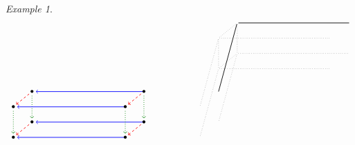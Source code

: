 \documentclass[12pt]{amsart}
\theoremstyle{definition}
\theoremstyle{remark}
\newtheorem{example}[thm]{Example}
\numberwithin{equation}{section}
\begin{document}
\begin{example}
\begin{equation}
\begin{array}{l}
\begin{tikzpicture}[yscale=0.7,xscale=0.85]
\begin{scope}[xshift=6cm]
\end{scope}

\begin{scope}[yshift=-4.5cm,xshift=-1cm]

\node[inner sep=1pt,circle] (00) at (0,0) {\tiny $\bullet$};
\node[inner sep=1pt,circle] (11) at (1,1) {\tiny $\bullet$};
\node[inner sep=1pt,circle] (02) at (0,2) {\tiny $\bullet$};
\node[inner sep=1pt,circle] (13) at (1,3) {\tiny $\bullet$};

\draw[<-,green!50!black,dotted,thick] (00) -- (02); 
\draw[<-,green!50!black,dotted,thick] (11) -- (13); 
\draw[<-,red,dashed,thick] (00) -- (11);
\draw[<-,red,dashed,thick] (02) -- (13);
    

\draw[<-,blue,thick] (00) -- (6,0);
\draw[<-,blue,thick] (13) -- (7,3);
\draw[<-,blue,thick] (11) -- (7,1);
\draw[<-,blue,thick] (02) -- (6,2);

\end{scope}

\begin{scope}[yshift=-4.5cm,xshift=5cm]

\node[inner sep=1pt,circle] (00) at (0,0) {\tiny $\bullet$};
\node[inner sep=1pt,circle] (11) at (1,1) {\tiny $\bullet$};
\node[inner sep=1pt,circle] (02) at (0,2) {\tiny $\bullet$};
\node[inner sep=1pt,circle] (13) at (1,3) {\tiny $\bullet$};

\draw[<-,green!50!black,dotted,thick] (00) -- (02); 
\draw[<-,green!50!black,dotted,thick] (11) -- (13); 
\draw[<-,red,dashed,thick] (00) -- (11);
\draw[<-,red,dashed,thick] (02) -- (13);

\end{scope}



\begin{scope}[xshift=10cm]

\node[inner sep=1pt,circle] (00) at (0,0) {\tiny $ $};
\node[inner sep=1pt,circle] (11) at (1,1) {\tiny $ $};
\node[inner sep=1pt,circle] (02) at (0,2) {\tiny $ $};
\node[inner sep=1pt,circle] (13) at (1,3) {\tiny $ $};

\draw[-,dotted] (00) -- (02); 
\draw[-,dotted] (11) -- (13); 
\draw[-,dotted] (00) -- (11);
\draw[-,dotted] (02) -- (13);


\draw[-,dotted] (00) -- (6,0);
\draw[-,thick] (13) -- (7,3);
\draw[-,dotted] (11) -- (7,1);
\draw[-,dotted] (02) -- (6,2);

\draw[-,dotted] (00) -- (-1,-4.5);
\draw[-,dotted] (11) -- (0,-3.5);
\draw[-,dotted] (02) -- (-1,-2.5);
\draw[-,thick] (13) -- (0,-1.5);


\end{scope}
\end{tikzpicture}
\end{array}
\end{equation}
\end{example}
\end{document}
